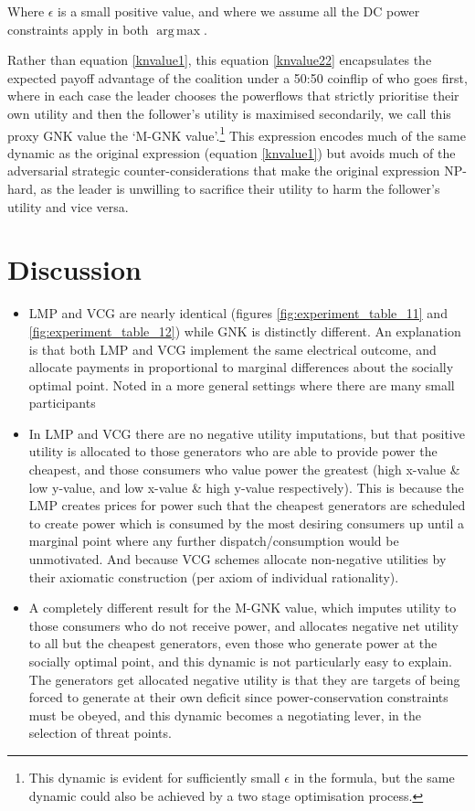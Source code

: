 \documentclass[
10pt, %
a4paper, %
oneside, %
headinclude,footinclude, %
BCOR5mm, %
]{scrartcl}
\DeclareMathOperator*{\argmax}{arg\,max}
\begin{document}
Where $\epsilon$ is a small positive value, and where we assume all the DC power constraints apply in both $\argmax$.

Rather than equation \eqref{knvalue1}, this equation \eqref{knvalue22} encapsulates the expected payoff advantage of the coalition under a 50:50 coinflip of who goes first, where in each case the leader chooses the powerflows that strictly prioritise their own utility and then the follower's utility is maximised secondarily, we call this proxy GNK value the `M-GNK value'.\footnote{This dynamic is evident for sufficiently small $\epsilon$ in the formula, but the same dynamic could also be achieved by a two stage optimisation process.}
This expression encodes much of the same dynamic as the original expression (equation \ref{knvalue1}) but avoids much of the adversarial strategic counter-considerations that make the original expression NP-hard, as the leader is unwilling to sacrifice their utility to harm the follower's utility and vice versa.





\section{Discussion}

\begin{itemize}
\item	LMP and VCG are nearly identical (figures \ref{fig:experiment_table_11} and \ref{fig:experiment_table_12}) while GNK is distinctly different. An explanation is that both LMP and VCG implement the same electrical outcome, and allocate payments in proportional to marginal differences about the socially optimal point. Noted in a more general settings where there are many small participants \cite{NATH2019673, 8430852}
\item	In LMP and VCG there are no negative utility imputations, but that positive utility is allocated to those generators who are able to provide power the cheapest, and those consumers who value power the greatest (high x-value \& low y-value, and low x-value \& high y-value respectively).
This is because the LMP creates prices for power such that the cheapest generators are scheduled to create power which is consumed by the most desiring consumers up until a marginal point where any further dispatch/consumption would be unmotivated.
And because VCG schemes allocate non-negative utilities by their axiomatic construction (per axiom of individual rationality).
\item	A completely different result for the M-GNK value, which imputes utility to those consumers who do not receive power, and allocates negative net utility to all but the cheapest generators, even those who generate power at the socially optimal point, and this dynamic is not particularly easy to explain. The generators get allocated negative utility is that they are targets of being forced to generate at their own deficit since power-conservation constraints must be obeyed, and this dynamic becomes a negotiating lever, in the selection of threat points.

\end{itemize}
\end{document}
